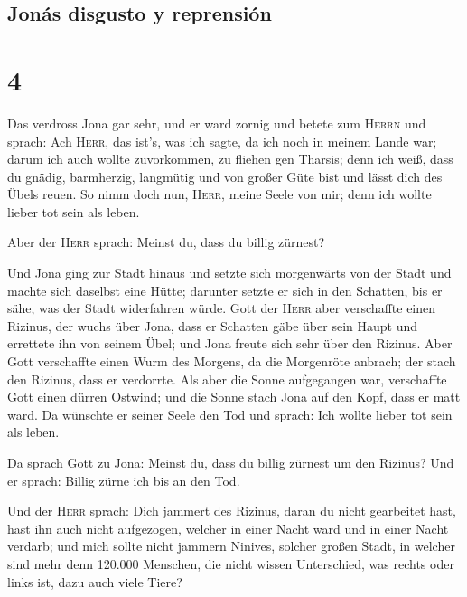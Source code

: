 \hypertarget{jonuxe1s-disgusto-y-reprensiuxf3n}{%
\subsection{Jonás disgusto y
reprensión}\label{jonuxe1s-disgusto-y-reprensiuxf3n}}

\hypertarget{section-3}{%
\section{4}\label{section-3}}

 Das verdross Jona gar sehr, und er ward zornig
 und betete zum \textsc{Herrn} und sprach: Ach
\textsc{Herr}, das ist's, was ich sagte, da ich noch in meinem Lande
war; darum ich auch wollte zuvorkommen, zu fliehen gen Tharsis; denn ich
weiß, dass du gnädig, barmherzig, langmütig und von großer Güte bist und
lässt dich des Übels reuen.  So nimm doch nun,
\textsc{Herr}, meine Seele von mir; denn ich wollte lieber tot sein als
leben.

 Aber der \textsc{Herr} sprach: Meinst du, dass du billig
zürnest?

 Und Jona ging zur Stadt hinaus und setzte sich
morgenwärts von der Stadt und machte sich daselbst eine Hütte; darunter
setzte er sich in den Schatten, bis er sähe, was der Stadt widerfahren
würde.  Gott der \textsc{Herr} aber verschaffte einen
Rizinus, der wuchs über Jona, dass er Schatten gäbe über sein Haupt und
errettete ihn von seinem Übel; und Jona freute sich sehr über den
Rizinus.  Aber Gott verschaffte einen Wurm des Morgens, da
die Morgenröte anbrach; der stach den Rizinus, dass er verdorrte.
 Als aber die Sonne aufgegangen war, verschaffte Gott
einen dürren Ostwind; und die Sonne stach Jona auf den Kopf, dass er
matt ward. Da wünschte er seiner Seele den Tod und sprach: Ich wollte
lieber tot sein als leben.

 Da sprach Gott zu Jona: Meinst du, dass du billig zürnest
um den Rizinus? Und er sprach: Billig zürne ich bis an den Tod.

 Und der \textsc{Herr} sprach: Dich jammert des Rizinus,
daran du nicht gearbeitet hast, hast ihn auch nicht aufgezogen, welcher
in einer Nacht ward und in einer Nacht verdarb;  und mich
sollte nicht jammern Ninives, solcher großen Stadt, in welcher sind mehr
denn 120.000 Menschen, die nicht wissen Unterschied, was rechts oder
links ist, dazu auch viele Tiere?
